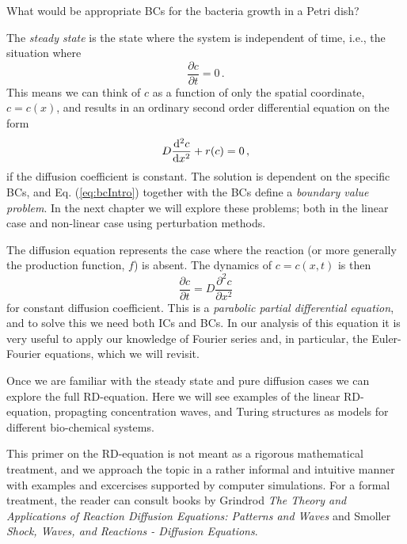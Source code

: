 \begin{question}
	What would be appropriate BCs for the bacteria growth in a Petri dish?
\end{question}

\noindent The \emph{steady state} is the state where the system is independent
of time, i.e., the situation where 
\begin{equation}
	\frac{\partial c}{\partial t} = 0 \, .
\end{equation}
This means we can think of $c$ as a function of only the spatial coordinate, 
$c = c(x)$, and results in an ordinary second order differential equation on the form
\begin{equation}
	\label{eq:bcIntro}
	D\frac{\mathrm{d}^2 c}{\mathrm{d} x^2} + r(c) = 0 \, ,
\end{equation}
if the diffusion coefficient is constant. The solution is dependent on the specific BCs, 
and Eq. (\ref{eq:bcIntro}) together with the BCs define a 
\emph{boundary value problem}. In the next chapter we will explore these problems; both in the linear case and 
non-linear case using perturbation methods. 

The diffusion equation represents the case where the reaction (or more generally the 
production function, $f$) is 
absent. The dynamics of $c=c(x,t)$ is then
\begin{equation}
	\frac{\partial c}{\partial t} = D \frac{\partial^2 c}{\partial x^2} 
\end{equation}
for constant diffusion coefficient. This is a 
\emph{parabolic partial differential equation}, and to solve this we need both ICs 
and BCs. In our analysis of this equation it is very 
useful to apply our knowledge of Fourier series and, in particular,  
the Euler-Fourier equations, which we will revisit.

Once we are familiar with the steady state and pure diffusion cases we can explore the full 
RD-equation. Here we will see examples of the linear RD-equation, propagting concentration waves, and Turing 
structures as models for different bio-chemical systems.

This primer on the RD-equation is not meant as a rigorous mathematical treatment, and we approach the topic 
in a rather informal and intuitive manner with examples and excercises supported by computer simulations. 
For a formal treatment, the reader can consult books by 
Grindrod \emph{The Theory and Applications of Reaction Diffusion Equations: Patterns and Waves}
and Smoller \emph{Shock, Waves, and Reactions - Diffusion Equations}.  


